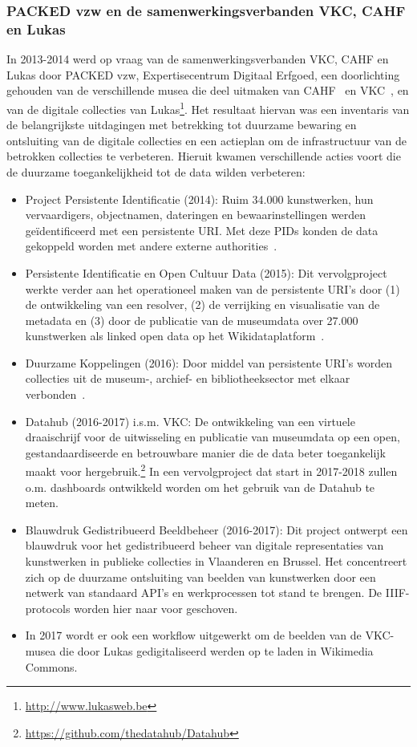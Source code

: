 \documentclass[fleqn,10pt]{voorstel}
\begin{document}
\subsubsection{PACKED vzw en de samenwerkingsverbanden VKC, CAHF en Lukas}
In 2013-2014 werd op vraag van de samenwerkingsverbanden VKC, CAHF en Lukas door PACKED vzw, Expertisecentrum Digitaal Erfgoed, een doorlichting gehouden van de verschillende musea die deel uitmaken van CAHF~\autocite{Lemmens2013-2} en VKC~\autocite{Lemmens2013}, en van de digitale collecties van Lukas\footnote{\href{http://www.lukasweb.be}{http://www.lukasweb.be}}. Het resultaat hiervan was een inventaris van de belangrijkste uitdagingen met betrekking tot duurzame bewaring en ontsluiting van de digitale collecties en een actieplan om de infrastructuur van de betrokken collecties te verbeteren. Hieruit kwamen verschillende acties voort die de duurzame toegankelijkheid tot de data wilden verbeteren:
	\begin{itemize}
		\item Project Persistente Identificatie (2014): Ruim 34.000 kunstwerken, hun vervaardigers, objectnamen, dateringen en bewaarinstellingen werden geïdentificeerd met een persistente URI. Met deze PIDs konden de data gekoppeld worden met andere externe authorities~\autocite{Saenko2014}.
		\item Persistente Identificatie en Open Cultuur Data (2015): Dit vervolgproject werkte verder aan het operationeel maken van de persistente URI's door (1) de ontwikkeling van een resolver, (2) de verrijking en visualisatie van de metadata en (3) door de publicatie van de museumdata over 27.000 kunstwerken als linked open data op het Wikidataplatform~\autocite{Saenko2016}.
		\item Duurzame Koppelingen (2016): Door middel van persistente URI's worden collecties uit de museum-, archief- en bibliotheeksector met elkaar verbonden~\autocite{SaenkoLemmens2016}.
		\item Datahub (2016-2017) i.s.m. VKC: De ontwikkeling van een virtuele draaischrijf voor de uitwisseling en publicatie van museumdata op een open, gestandaardiseerde en betrouwbare manier die de data beter toegankelijk maakt voor hergebruik.\footnote{\href{https://github.com/thedatahub/Datahub}{https://github.com/thedatahub/Datahub}} In een vervolgproject dat start in 2017-2018 zullen o.m. dashboards ontwikkeld worden om het gebruik van de Datahub te meten.
		\item Blauwdruk Gedistribueerd Beeldbeheer (2016-2017): Dit project ontwerpt een blauwdruk voor het gedistribueerd beheer van digitale representaties van kunstwerken in publieke collecties in Vlaanderen en Brussel. Het concentreert zich op de duurzame ontsluiting van beelden van kunstwerken door een netwerk van standaard API's en werkprocessen tot stand te brengen. De IIIF-protocols worden hier naar voor geschoven.
		\item In 2017 wordt er ook een workflow uitgewerkt om de beelden van de VKC-musea die door Lukas gedigitaliseerd werden op te laden in Wikimedia Commons.
	\end{itemize}
\end{document}
